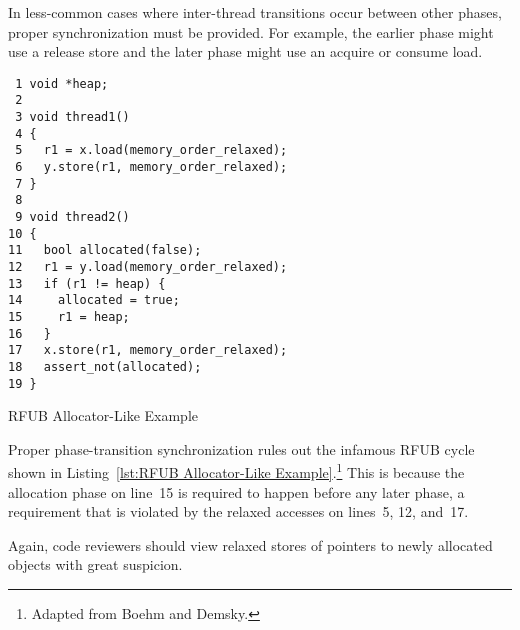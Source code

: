 \documentclass[10]{article}
\begin{document}
In less-common cases where inter-thread transitions occur between other
phases, proper synchronization must be provided.
For example, the earlier phase might use a release store and
the later phase might use an acquire or consume load.

\begin{listing}[tbp]
\begin{verbatim}
 1 void *heap;
 2
 3 void thread1()
 4 {
 5   r1 = x.load(memory_order_relaxed);
 6   y.store(r1, memory_order_relaxed);
 7 }
 8
 9 void thread2()
10 {
11   bool allocated(false);
12   r1 = y.load(memory_order_relaxed);
13   if (r1 != heap) {
14     allocated = true;
15     r1 = heap;
16   }
17   x.store(r1, memory_order_relaxed);
18   assert_not(allocated);
19 }
\end{verbatim}
\caption{RFUB Allocator-Like Example}
\label{lst:RFUB Allocator-Like Example}
\end{listing}

Proper phase-transition synchronization rules out the infamous RFUB
cycle shown in Listing~\ref{lst:RFUB Allocator-Like Example}.\footnote{
	Adapted from Boehm and
	Demsky\cite[Figure 5]{Boehm:2014:OGA:2618128.2618134}.}
This is because the allocation phase on line~15 is required to happen
before any later phase, a requirement that is violated by the relaxed
accesses on lines~5, 12, and~17.

Again, code reviewers should view relaxed stores of pointers to newly
allocated objects with great suspicion.




\end{document}
